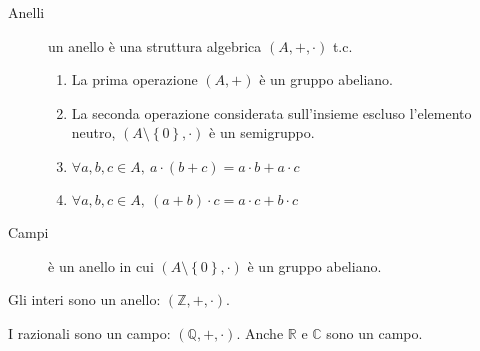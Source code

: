 \begin{description}
    \item[Anelli] un anello \`e una struttura algebrica $(A, +, \cdot)$ t.c. 
    \begin{enumerate}
        \item La prima operazione $\left( A, + \right )$ \`e un gruppo abeliano.
        \item La seconda operazione considerata sull'insieme escluso l'elemento neutro, $(A \setminus \left \{ 0 \right \}, \cdot )$ \`e un semigruppo.
        \item $ \forall a, b, c \in A , \ a \cdot (b + c) = a \cdot b + a \cdot c $
        \item $ \forall a, b, c \in A , \ (a + b) \cdot c = a \cdot c + b \cdot c $
    \end{enumerate}
    \item[Campi] \`e un anello in cui $( A \setminus \left \{ 0 \right \}, \cdot )$ \`e un gruppo abeliano.
\end{description}

Gli interi sono un anello: $\left ( \mathbb{Z}, +, \cdot \right )$.

I razionali sono un campo: $\left ( \mathbb{Q}, +, \cdot \right )$. Anche $\mathbb{R}$ e $\mathbb{C}$ sono un campo.